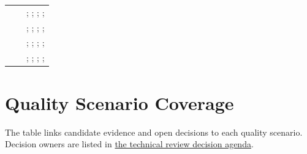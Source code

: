 \begin{tabularx}{\linewidth}{L{2.3cm}L{1.8cm}Y}
 &  & ; ; ; ; \\
 &  & ; ; ; ; \\
 &  & ; ; ; ; \\
 &  & ; ; ; ; \\
\end{tabularx}
\normalsize

\section{Quality Scenario Coverage}
The table links candidate evidence and open decisions to each quality scenario.
Decision owners are listed in \hyperref[Section:ReviewDecisions]{the technical review decision agenda}.

